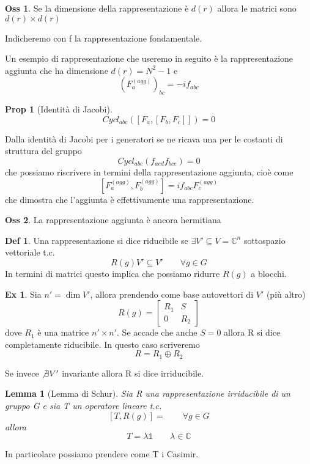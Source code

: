 \documentclass[10pt,a4paper]{article}
\newtheorem{prop}{Prop}[section]
\newtheorem{lemma}{Lemma}[section]
\theoremstyle{definition}
\newtheorem{definition}{Def}[section]
\newtheorem{observation}{Oss}[section]
\newtheorem{example}{Ex}[section]
\begin{document}
\begin{observation}
    Se la dimensione della rappresentazione è $d(r)$ allora le matrici sono $d(r) \times d(r)$
\end{observation}

Indicheremo con f la rappresentazione fondamentale.

Un esempio di rappresentazione che useremo in seguito è la rappresentazione aggiunta che ha dimensione $d(r) = N^2 - 1$ e 
\[
(F_a^{(agg)})_{bc} = -if_{abc}    
\]

\begin{prop}[Identità di Jacobi]
   \[ Cycl_{abc}([F_a, [F_b, F_c]]) = 0\]
\end{prop}

Dalla identità di Jacobi per i generatori se ne ricava una per le costanti di struttura del gruppo
\[
Cycl_{abc}(f_{aed}f_{bce}) = 0    
\]
che possiamo riscrivere in termini della rappresentazione aggiunta, cioè come
\[
[F_a^{(agg)}, F_b^{(agg)}] = i f_{abc}F_c^{(agg)}    
\]
che dimostra che l'aggiunta è effettivamente una rappresentazione.

\begin{observation}
    La rappresentazione aggiunta è ancora hermitiana
\end{observation}

\begin{definition}
Una rappresentazione si dice riducibile se $\exists V' \subseteq V = \mathbb{C}^n$ sottospazio vettoriale t.c. 
\[
R(g)V' \subseteq V' \qquad \forall g \in G    
\]
In termini di matrici questo implica che possiamo ridurre $R(g)$ a blocchi.
\end{definition}

\begin{example}
    Sia \( n' = \dim V' \), allora prendendo come base autovettori di $V'$ (più altro)
    \[
    R(g) = 
    \begin{bmatrix}
        R_1 & S \\
        0 & R_2
    \end{bmatrix}    
    \]
    dove $R_1$ è una matrice $n' \times n'$.
    Se accade che anche $S = 0$ allora R si dice completamente riducibile.
    In questo caso scriveremo
    \[
    R = R_1 \oplus R_2    
    \]
\end{example}
Se invece $\not\exists V'$ invariante allora R si dice irriducibile.

\begin{lemma}[Lemma di Schur]
    Sia R una rappresentazione irriducibile di un gruppo G e sia T un operatore lineare t.c.
    \[
    [T, R(g)] = \qquad \forall g \in G     
    \]
    allora
    \[
        T = \lambda\mathbb{1}\qquad \lambda \in \mathbb{C}
    \]
\end{lemma}
In particolare possiamo prendere come T i Casimir.
\end{document}
